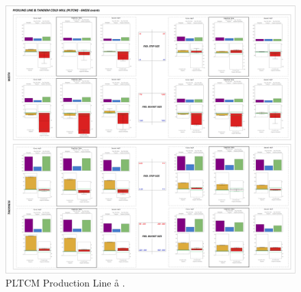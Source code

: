 \begin{landscape}
	\begin{figure}[ht]
		\centering
		\vspace*{-1.5cm}
		\captionsetup{width=1.1\linewidth}
		\includegraphics[width=1.2\textwidth]{../images/supplements-PLTCM_real_life_events_analysis-results.png}
		\caption{PLTCM Production Line \aa{} \bb{}.}
		\label{figure-supplements-PLTCM}
	\end{figure}
\end{landscape}